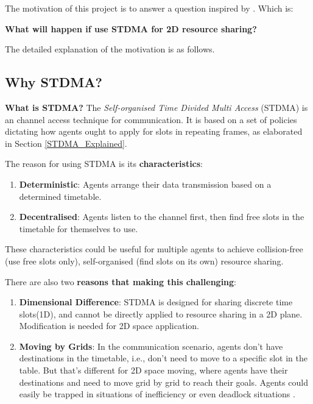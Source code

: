 \documentclass[12pt, oneside]{article}
\begin{document}
The motivation of this project is to answer a question inspired by \cite{Paper_From_Supervisor}. Which is:

\label{Question}

\begin{displayquote}
\textbf{What will happen if use STDMA for 2D resource sharing?}
\end{displayquote}

The detailed explanation of the motivation is as follows.

\subsection{Why STDMA?}
\label{Why STDMA}
\textbf{What is STDMA?} The \textit{Self-organised Time Divided Multi Access} (STDMA) is an channel access technique for communication. It is based on a set of policies dictating how agents ought to apply for slots in repeating frames, as elaborated in Section \ref{STDMA_Explained}.

 \vspace{0.4cm}

The reason for using STDMA is its \textbf{characteristics}\cite{STDMA_characteristic}:
\begin{enumerate}
    \item \textbf{Deterministic}: Agents arrange their data transmission based on a determined timetable.
    \item \textbf{Decentralised}: Agents listen to the channel first, then find free slots in the timetable for themselves to use.
\end{enumerate}

These characteristics could be useful for multiple agents to achieve collision-free (use free slots only), self-organised (find slots on its own) resource sharing.

There are also two \textbf{reasons that making this challenging}:
\begin{enumerate}
    \item \textbf{Dimensional Difference}: STDMA is designed for sharing discrete time slots(1D), and cannot be directly applied to resource sharing in a 2D plane. Modification is needed for 2D space application.
    \item \textbf{Moving by Grids}: In the communication scenario, agents don't have destinations in the timetable, i.e., don't need to move to a specific slot in the table. But that's different for 2D space moving, where agents have their destinations and need to move grid by grid to reach their goals. Agents could easily be trapped in situations of inefficiency or even deadlock situations \cite{MAPF_Deadlock_Explain1,MAPF_Deadlock_Explain2}.
\end{enumerate}
\end{document}

